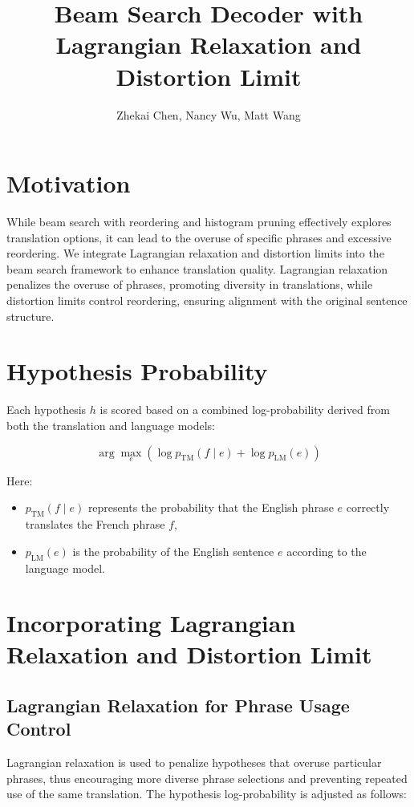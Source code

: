 \documentclass{article}
\title{Beam Search Decoder with Lagrangian Relaxation and Distortion Limit}
\author{Zhekai Chen, Nancy Wu, Matt Wang}
\date{}
\begin{document}
\maketitle

\section{Motivation}

While beam search with reordering and histogram pruning effectively explores translation options, it can lead to the overuse of specific phrases and excessive reordering. We integrate Lagrangian relaxation and distortion limits into the beam search framework to enhance translation quality. Lagrangian relaxation penalizes the overuse of phrases, promoting diversity in translations, while distortion limits control reordering, ensuring alignment with the original sentence structure.

\section{Hypothesis Probability}

Each hypothesis \( h \) is scored based on a combined log-probability derived from both the translation and language models:

\[
\arg\max_e \left( \log p_{\text{TM}}(f \mid e) + \log p_{\text{LM}}(e) \right)
\]

Here:
\begin{itemize}
    \item \( p_{\text{TM}}(f \mid e) \) represents the probability that the English phrase \( e \) correctly translates the French phrase \( f \),
    \item \( p_{\text{LM}}(e) \) is the probability of the English sentence \( e \) according to the language model.
\end{itemize}


\section{Incorporating Lagrangian Relaxation and Distortion Limit}
\subsection{Lagrangian Relaxation for Phrase Usage Control}
Lagrangian relaxation is used to penalize hypotheses that overuse particular phrases, thus encouraging more diverse phrase selections and preventing repeated use of the same translation. The hypothesis log-probability is adjusted as follows:
\end{document}
